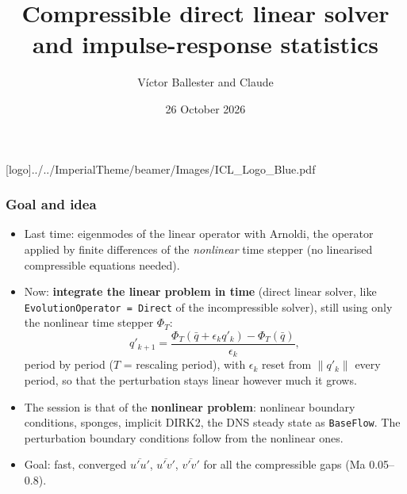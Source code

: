 \documentclass[
  aspectratio=169,
  t,
  onlytextwidth,
  10pt,
]{beamer}
\title{Compressible direct linear solver and impulse-response statistics}
\author{Víctor Ballester and Claude}
\date{26 October 2026}
\def\imagefolder{../../ImperialTheme/beamer/Images}
\newcommand{\qb}{\bar{q}}
\newcommand{\PhiT}{\Phi_T}
\begin{document}
\begingroup
{}
[logo]{\imagefolder/ICL_Logo_Blue.pdf}
\frame[plain, s]{\titlepage}
\endgroup

\begin{frame}
	\frametitle{Goal and idea}
	\begin{itemize}
		\item Last time: eigenmodes of the linear operator with Arnoldi, the operator applied by finite differences of the \emph{nonlinear} time stepper (no linearised compressible equations needed).
		\item Now: \textbf{integrate the linear problem in time} (direct linear solver, like \texttt{EvolutionOperator = Direct} of the incompressible solver), still using only the nonlinear time stepper $\PhiT$:
		      \[
			      q'_{k+1} = \frac{\PhiT(\qb + \epsilon_k q'_k) - \PhiT(\qb)}{\epsilon_k},
		      \]
		      period by period ($T$ = rescaling period), with $\epsilon_k$ reset from $\|q'_k\|$ every period, so that the perturbation stays linear however much it grows.
		\item The session is that of the \textbf{nonlinear problem}: nonlinear boundary conditions, sponges, implicit DIRK2, the DNS steady state as \texttt{BaseFlow}. The perturbation boundary conditions follow from the nonlinear ones.
		\item Goal: fast, converged $\overline{u'u'}$, $\overline{u'v'}$, $\overline{v'v'}$ for all the compressible gaps (Ma 0.05--0.8).
	\end{itemize}
\end{frame}
\end{document}
